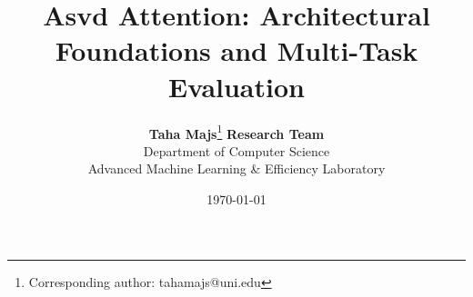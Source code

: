 \title{\textbf{Asvd Attention: Architectural Foundations and Multi-Task Evaluation}}

\author{
  \textbf{Taha Majs}\thanks{Corresponding author: tahamajs@uni.edu} \quad \textbf{Research Team} \\
  Department of Computer Science \\
  Advanced Machine Learning \& Efficiency Laboratory
}

\date{\today}
